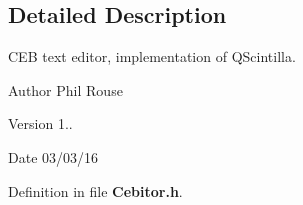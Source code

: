 \subsection{Detailed Description}
C\-E\-B text editor, implementation of Q\-Scintilla. \begin{DoxyAuthor}{Author}
Phil Rouse 
\end{DoxyAuthor}
\begin{DoxyVersion}{Version}
1.. 
\end{DoxyVersion}
\begin{DoxyDate}{Date}
03/03/16 
\end{DoxyDate}


Definition in file {\bf Cebitor.\-h}.

